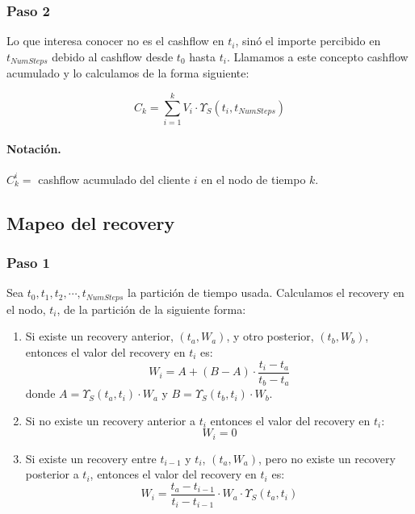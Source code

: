 \subsubsection{Paso 2}

Lo que interesa conocer no es el cashflow en $t_i$, sin\'o el importe
percibido en $t_{NumSteps}$ debido al cashflow desde $t_0$ hasta $t_i$.
Llamamos a este concepto cashflow acumulado y lo calculamos de la
forma siguiente:

\begin{displaymath}
C_k = \sum_{i=1}^{k} V_i \cdot \Upsilon_S(t_i,t_{NumSteps})
\end{displaymath}


\paragraph{Notaci\'on.} $C_k^i =$ cashflow acumulado del cliente $i$ en el
nodo de tiempo $k$.


\subsection{Mapeo del recovery}

\subsubsection{Paso 1}

Sea $t_0, t_1, t_2, \cdots, t_{NumSteps}$ la partici\'on de tiempo usada.
Calculamos el recovery en el nodo, $t_i$, de la partici\'on de la
siguiente forma:

\begin{enumerate}
\item Si existe un recovery anterior, $(t_a,W_a)$, y otro posterior, $(t_b,W_b)$,
entonces el valor del recovery en $t_i$ es:
\begin{displaymath}
W_i = A + (B-A) \cdot \frac{t_i-t_a}{t_b-t_a}
\end{displaymath}
donde
$A=\Upsilon_S(t_a,t_i) \cdot W_a$ y $B=\Upsilon_S(t_b,t_i) \cdot W_b$.
\item Si no existe un recovery anterior a $t_i$ entonces el valor del recovery
en $t_i$:
\begin{displaymath}
W_i = 0
\end{displaymath}
\item Si existe un recovery entre $t_{i-1}$ y $t_i$, $(t_a,W_a)$, pero no existe un
recovery posterior a $t_i$, entonces el valor del recovery en $t_i$ es:
\begin{displaymath}
W_i = \frac{t_a-t_{i-1}}{t_i-t_{i-1}} \cdot W_a \cdot \Upsilon_S(t_a,t_i)
\end{displaymath}
\end{enumerate}

